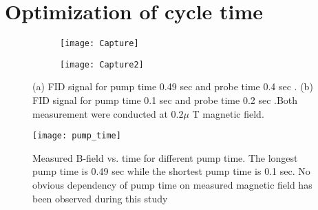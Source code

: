 \documentclass[12pt]{report}
\begin{document}
   \section{Optimization of cycle time} 
   \begin{figure}
    \centering
 
    \begin{subfigure}[b]{0.425\textwidth}
        \centering
        \texttt{[image: Capture]}
        \caption{}
        \label{fig:three sin x}
    \end{subfigure}
    \hfill
    \begin{subfigure}[b]{0.42\textwidth}
        \centering
        \texttt{[image: Capture2]}
        \caption{}
        \label{fig:five over x}
    \end{subfigure}
    \caption{(a) FID signal for pump time 0.49 sec and probe time 0.4 sec . (b) FID signal for pump time 0.1 sec and probe time 0.2 sec .Both measurement were conducted at $0.2 \mu$ T magnetic field.}
    \label{fig:three graphs}
\end{figure} 
   \begin{figure}[h]
\centering\texttt{[image: pump\_time]}
\caption{Measured B-field vs. time   for different pump time. The longest pump time is 0.49 sec while the shortest pump time is 0.1 sec. No obvious dependency of pump time on  measured magnetic field has been observed during this study}
\end{figure}
\end{document}
